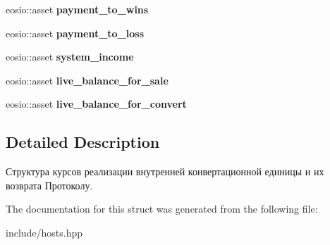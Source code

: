 \begin{DoxyCompactItemize}
\mbox{\label{structrate_a8139680b8f6fe6087e669f6aafa16570}} 
eosio\+::asset {\bfseries payment\+\_\+to\+\_\+wins}
\item 
\mbox{\label{structrate_acfb02bea7cf708ddb76f0d2a40cfdc37}} 
eosio\+::asset {\bfseries payment\+\_\+to\+\_\+loss}
\item 
\mbox{\label{structrate_a2a8e6ec3756b3db73f6113117d2e47f9}} 
eosio\+::asset {\bfseries system\+\_\+income}
\item 
\mbox{\label{structrate_a0187445eb6729f79be32af3af174a87f}} 
eosio\+::asset {\bfseries live\+\_\+balance\+\_\+for\+\_\+sale}
\item 
\mbox{\label{structrate_ae65d9d51957c5ed2eac024f2371a475e}} 
eosio\+::asset {\bfseries live\+\_\+balance\+\_\+for\+\_\+convert}
\end{DoxyCompactItemize}


\subsection{Detailed Description}
Структура курсов реализации внутренней конвертационной единицы и их возврата Протоколу. 

The documentation for this struct was generated from the following file\+:\begin{DoxyCompactItemize}
\item 
include/hosts.\+hpp\end{DoxyCompactItemize}
